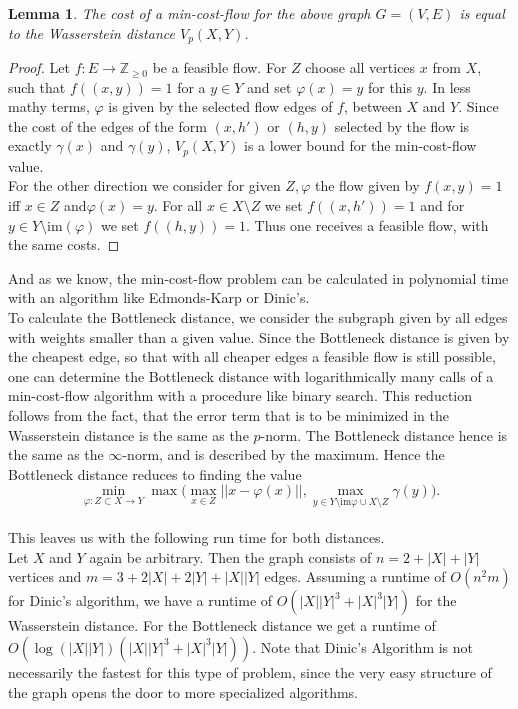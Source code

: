 \documentclass[11pt, a4paper, UKenglish]{article}
\newtheorem{lemma}{Lemma}
\newcommand{\bZ}{\mathbb{Z}}
\newcommand{\im}{\textrm{im}}
\begin{document}
    \begin{lemma}
        The cost of a min-cost-flow for the above graph $G=(V,E)$ is equal to the Wasserstein distance $V_p(X,Y)$.
    \end{lemma}
    \begin{proof}
        Let $f:E\rightarrow \bZ_{\geq0}$ be a feasible flow.
        For $Z$ choose all vertices $x$ from $X$, such that $f((x,y))=1$ for a $y\in Y$ and set $\varphi(x) = y$ for this $y$.
        In less mathy terms, $\varphi$ is given by the selected flow edges of $f$, between $X$ and $Y$.
        Since the cost of the edges of the form $(x,h')$ or $(h,y)$ selected by the flow is exactly $\gamma(x)$ and $\gamma(y)$, $V_p(X,Y)$ is a lower bound for the min-cost-flow value.\\
        For the other direction we consider for given $Z,\varphi$ the flow given by $f(x,y)=1$ iff $x\in Z$ and$ \varphi(x)=y$.
        For all $x\in X\setminus Z$ we set $f((x,h'))=1$ and for $y\in Y\setminus \im(\varphi)$ we set $f((h,y))=1$.
        Thus one receives a feasible flow, with the same costs.
    \end{proof}

    And as we know, the min-cost-flow problem can be calculated in polynomial time with an algorithm like Edmonds-Karp or Dinic's.\\
    To calculate the Bottleneck distance, we consider the subgraph given by all edges with weights smaller than a given value.
    Since the Bottleneck distance is given by the cheapest edge, so that with all cheaper edges a feasible flow is still possible, one can determine the Bottleneck distance with logarithmically many calls of a min-cost-flow algorithm with a procedure like binary search.
    This reduction follows from the fact, that the error term that is to be minimized in the Wasserstein distance is the same as the $p$-norm.
    The Bottleneck distance hence is the same as the $\infty$-norm, and is described by the maximum.
    Hence the Bottleneck distance reduces to finding the value \[\min_{\varphi:Z\subset X \rightarrow Y} \max\bigg(\max_{x\in Z}||x - \varphi(x)||,\max_{y\in Y\setminus\im\varphi\cup X\setminus Z}\gamma(y)\bigg).\]\\
    This leaves us with the following run time for both distances.\\
    Let $X$ and $Y$ again be arbitrary.
    Then the graph consists of $n=2+|X|+|Y|$ vertices and $m=3+2|X|+2|Y|+|X||Y|$ edges.
    Assuming a runtime of $O(n^2 m)$ for Dinic's algorithm, we have a runtime of $O(|X||Y|^3 + |X|^3|Y|)$ for the Wasserstein distance.
    For the Bottleneck distance we get a runtime of $O(\log(|X||Y|)(|X||Y|^3 + |X|^3|Y|))$.
    Note that Dinic's Algorithm is not necessarily the fastest for this type of problem, since the very easy structure of the graph opens the door to more specialized algorithms.
\end{document}

